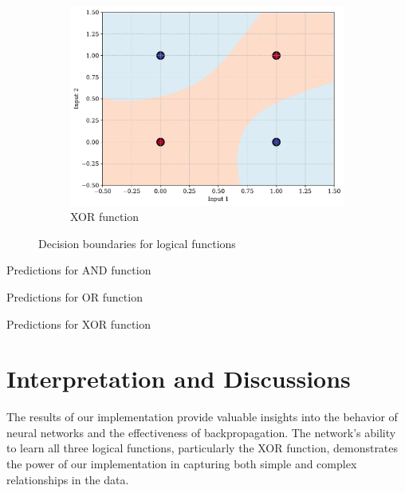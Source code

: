 \documentclass[11pt,a4paper]{article}
\begin{document}
\begin{figure}[H]
{\begin{minipage}{0.98\textwidth}
\begin{subfigure}[b]{0.48\textwidth}
        \centering
        \includegraphics[width=\textwidth]{img/xor_boundary.pdf}
        \caption{XOR function}
        \label{fig:xor_boundary}
    \end{subfigure}
    \caption{Decision boundaries for logical functions}
    \label{fig:decision_boundaries}
    \end{minipage}
    }
\end{figure}

\begin{table}[H]
    \centering
    \caption{Predictions for AND function}
    \label{tab:and_pred}
\end{table}

\begin{table}[H]
    \centering
    \caption{Predictions for OR function}
    \label{tab:or_pred}
\end{table}

\begin{table}[H]
    \centering
    \caption{Predictions for XOR function}
    \label{tab:xor_pred}
\end{table}

\section{Interpretation and Discussions}
\label{sec:discussion}
The results of our implementation provide valuable insights into the behavior of neural networks and the effectiveness of backpropagation. The network's ability to learn all three logical functions, particularly the XOR function, demonstrates the power of our implementation in capturing both simple and complex relationships in the data.
\end{document}
